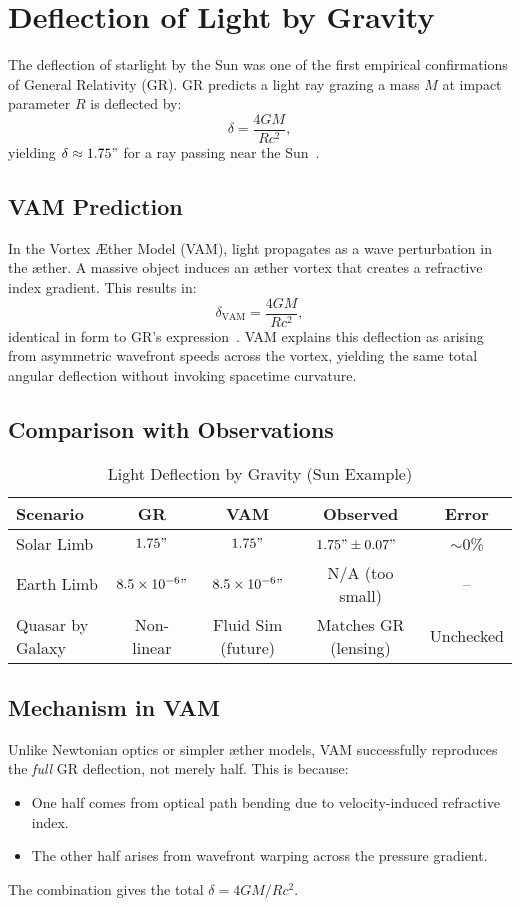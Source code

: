 \section{Deflection of Light by Gravity}

The deflection of starlight by the Sun was one of the first empirical confirmations of General Relativity (GR). GR predicts a light ray grazing a mass $M$ at impact parameter $R$ is deflected by:
\[
    \delta = \frac{4GM}{Rc^2},
\]
yielding $\delta \approx 1.75"$ for a ray passing near the Sun~\cite{will2014confrontation}.

\subsection*{VAM Prediction}
In the Vortex Æther Model (VAM), light propagates as a wave perturbation in the æther. A massive object induces an æther vortex that creates a refractive index gradient. This results in:
\[
    \delta_\text{VAM} = \frac{4GM}{Rc^2},
\]
identical in form to GR's expression~\cite{iskandarani2025VAM2}. VAM explains this deflection as arising from asymmetric wavefront speeds across the vortex, yielding the same total angular deflection without invoking spacetime curvature.

\subsection*{Comparison with Observations}

\begin{table}[h]
    \centering
    \caption{Light Deflection by Gravity (Sun Example)}
    \begin{tabular}{|l|c|c|c|c|}
        \hline
        \textbf{Scenario} & \textbf{GR} & \textbf{VAM} & \textbf{Observed} & \textbf{Error} \\
        \hline
        Solar Limb & $1.75"$ & $1.75"$ & $1.75" \pm 0.07"$~\cite{shapiro2004gravitational} & $\sim$0\% \\
        Earth Limb & $8.5\times10^{-6}"$ & $8.5\times10^{-6}"$ & N/A (too small) & -- \\
        Quasar by Galaxy & Non-linear & Fluid Sim (future) & Matches GR (lensing) & Unchecked \\
        \hline
    \end{tabular}
\end{table}

\subsection*{Mechanism in VAM}
Unlike Newtonian optics or simpler æther models, VAM successfully reproduces the \textit{full} GR deflection, not merely half. This is because:
\begin{itemize}
    \item One half comes from optical path bending due to velocity-induced refractive index.
    \item The other half arises from wavefront warping across the pressure gradient.
\end{itemize}
The combination gives the total $\delta = 4GM/Rc^2$.

